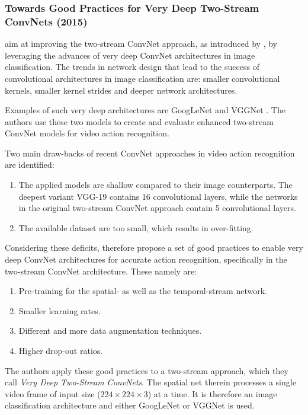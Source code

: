 \subsubsection{Towards Good Practices for Very Deep Two-Stream ConvNets (2015)}
\textcite{wang_towards_2015} aim at improving the two-stream ConvNet approach, as introduced by \textcite{simonyan_two-stream_2014}, by leveraging the advances of very deep ConvNet architectures in image classification.
The trends in network design that lead to the success of convolutional architectures in image classification are: smaller convolutional kernels, smaller kernel strides and deeper network architectures.\cite{wang_towards_2015}

Examples of such very deep architectures are GoogLeNet \cite{szegedy_going_2015} and VGGNet \cite{simonyan_very_2014}.
The authors use these two models to create and evaluate enhanced two-stream ConvNet models for video action recognition.

Two main draw-backs of recent ConvNet approaches in video action recognition are identified:
\begin{enumerate}
    \item The applied models are shallow compared to their image counterparts. The deepest variant VGG-19\cite{simonyan_very_2014} contains 16 convolutional layers, while the networks in the original two-stream ConvNet approach contain 5 convolutional layers.
    \item The available dataset are too small, which results in over-fitting.
\end{enumerate}

Considering these deficits, \textcite{wang_towards_2015} therefore propose a set of good practices to enable very deep ConvNet architectures for accurate action recognition, specifically in the two-stream ConvNet architecture.
These namely are:

\begin{enumerate}
    \item Pre-training for the spatial- as well as the temporal-stream network.
    \item Smaller learning rates.
    \item Different and more data augmentation techniques.
    \item Higher drop-out ratios.
\end{enumerate}

The authors apply these good practices to a two-stream approach, which they call \textit{Very Deep Two-Stream ConvNets}.
The spatial net therein processes a single video frame of input size ($224 \times 224 \times 3$) at a time.
It is therefore an image classification architecture and either GoogLeNet or VGGNet is used.

